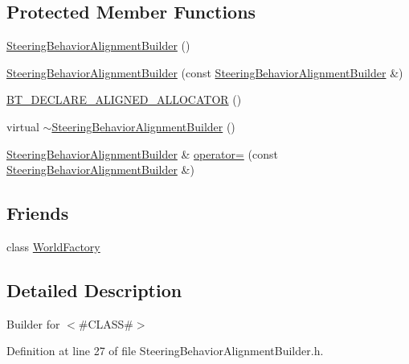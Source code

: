 \subsection*{Protected Member Functions}
\begin{DoxyCompactItemize}
\item 
\mbox{\hyperlink{classnjli_1_1_steering_behavior_alignment_builder_af0586d13b11896ce361d46f8b77411e6}{Steering\+Behavior\+Alignment\+Builder}} ()
\item 
\mbox{\hyperlink{classnjli_1_1_steering_behavior_alignment_builder_a652bc1e8e1181455722ce9b507378018}{Steering\+Behavior\+Alignment\+Builder}} (const \mbox{\hyperlink{classnjli_1_1_steering_behavior_alignment_builder}{Steering\+Behavior\+Alignment\+Builder}} \&)
\item 
\mbox{\hyperlink{classnjli_1_1_steering_behavior_alignment_builder_aa9c359e1d4a2244d02c88ce7104607ea}{B\+T\+\_\+\+D\+E\+C\+L\+A\+R\+E\+\_\+\+A\+L\+I\+G\+N\+E\+D\+\_\+\+A\+L\+L\+O\+C\+A\+T\+OR}} ()
\item 
virtual \mbox{\hyperlink{classnjli_1_1_steering_behavior_alignment_builder_a643b0576985530f5c511a1d1e0a29a3e}{$\sim$\+Steering\+Behavior\+Alignment\+Builder}} ()
\item 
\mbox{\hyperlink{classnjli_1_1_steering_behavior_alignment_builder}{Steering\+Behavior\+Alignment\+Builder}} \& \mbox{\hyperlink{classnjli_1_1_steering_behavior_alignment_builder_ab2ce565d5e2d34b64c63b1998cd76a39}{operator=}} (const \mbox{\hyperlink{classnjli_1_1_steering_behavior_alignment_builder}{Steering\+Behavior\+Alignment\+Builder}} \&)
\end{DoxyCompactItemize}
\subsection*{Friends}
\begin{DoxyCompactItemize}
\item 
class \mbox{\hyperlink{classnjli_1_1_steering_behavior_alignment_builder_acb96ebb09abe8f2a37a915a842babfac}{World\+Factory}}
\end{DoxyCompactItemize}


\subsection{Detailed Description}
Builder for $<$\#\+C\+L\+A\+SS\#$>$ 

Definition at line 27 of file Steering\+Behavior\+Alignment\+Builder.\+h.



